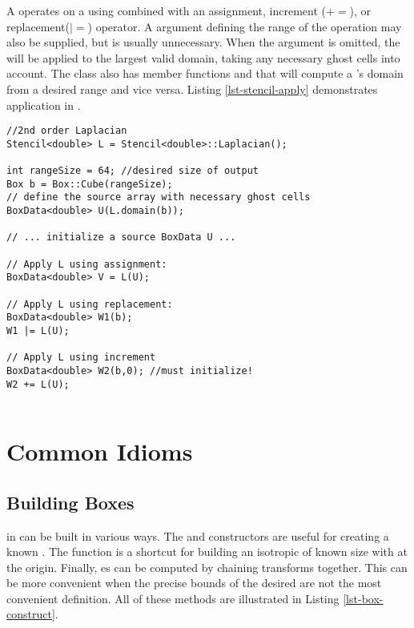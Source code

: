 \documentclass[12pt,a4paper]{article}
\begin{document}
A  operates on a  using  combined with an assignment, increment ($+=$), or replacement($|=$) operator. A  argument defining the range of the operation may also be supplied, but is usually unnecessary. When the  argument is omitted, the  will be applied to the largest valid domain, taking any necessary ghost cells into account. The  class also has member functions  and  that will compute a 's domain from  a desired range and vice versa. Listing \ref{lst-stencil-apply} demonstrates  application in \libname .

\begin{lstlisting}[caption=Stencil Application, label=lst-stencil-apply]
 //2nd order Laplacian
Stencil<double> L = Stencil<double>::Laplacian();

int rangeSize = 64; //desired size of output
Box b = Box::Cube(rangeSize);
// define the source array with necessary ghost cells
BoxData<double> U(L.domain(b));

// ... initialize a source BoxData U ... 

// Apply L using assignment:
BoxData<double> V = L(U);

// Apply L using replacement:
BoxData<double> W1(b);
W1 |= L(U);

// Apply L using increment
BoxData<double> W2(b,0); //must initialize!
W2 += L(U);
 
\end{lstlisting}

\section{Common Idioms}

\subsection{Building Boxes}

 in \libname can be built in various ways. The  and  constructors are useful for creating a known . The  function is a shortcut for building an isotropic  of known size with  at the origin. Finally, es can be computed by chaining transforms together. This can be more convenient when the precise bounds of the desired  are not the most convenient definition. All of these methods are illustrated in Listing \ref{lst-box-construct}.
\end{document}
